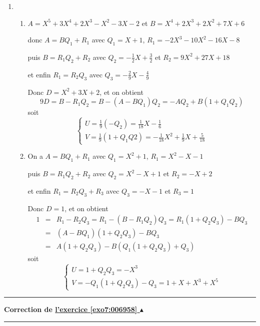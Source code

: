 \documentclass[11pt,a4paper]{article}
\newcounter{exo}
\newcommand{\correction}[1]{\hypertarget{cor7:#1}{}\label{cor7:#1}{\bf Correction de \hyperlink{exo7:#1}{l'exercice \ref{exo7:#1} $\blacktriangle$}}\vspace{1mm}\hrule\vspace{1mm}}
\newcommand{\fincorrection}{\vspace{1mm}\hrule\vspace*{7mm}}
\begin{document}
\begin{enumerate}
\begin{enumerate}
\end{enumerate}


\item \begin{enumerate}
\item $A=X^5+3X^4+2X^3-X^2-3X-2$ et $B=X^4+2X^3+2X^2+7X+6$

donc $A=BQ_1+R_1$ avec $Q_1=X+1$, $R_1=-2X^3-10X^2-16X-8$

puis $B=R_1Q_2+R_2$ avec $Q_2=-\frac{1}{2}X+\frac{3}{2}$ et $R_2=9X^2+27X+18$

et enfin $R_1=R_2Q_3$ avec $Q_3=-\frac{2}{9}X-\frac{4}{9}$

Donc $D=X^2+3X+2$, et on obtient
$$9D=B-R_1Q_2=B-(A-BQ_1)Q_2=-AQ_2+B(1+Q_1Q_2)$$
soit 
$$\left\{\begin{array}{l}U=\frac{1}{9}(-Q_2)=\frac{1}{18}X-\frac{1}{6}\\
V=\frac{1}{9}(1+Q_1Q2)=-\frac{1}{18}X^2+\frac{1}{9}X+\frac{5}{18}
\end{array}\right.$$

\item On a $A=BQ_1+R_1$ avec $Q_1=X^2+1$, $R_1=X^2-X-1$

puis $B=R_1Q_2+R_2$ avec $Q_2=X^2-X+1$ et $R_2=-X+2$

et enfin $R_1=R_2Q_3+R_3$ avec $Q_3=-X-1$ et $R_3=1$

Donc $D=1$, et on obtient
\begin{eqnarray*}
1&=&R_1-R_2Q_3=R_1-(B-R_1Q_2)Q_3=R_1(1+Q_2Q_3)-BQ_3\\
 &=&(A-BQ_1)(1+Q_2Q_3)-BQ_3\\
 &=&A(1+Q_2Q_3)-B(Q_1(1+Q_2Q_3)+Q_3)
\end{eqnarray*}
soit 
$$\left\{\begin{array}{l}
U=1+Q_2Q_3=-X^3\\
V=-Q_1(1+Q_2Q_3)-Q_3=1+X+X^3+X^5\end{array}\right.$$
\end{enumerate}
\end{enumerate}
\fincorrection
\correction{006958}
\
\end{document}
